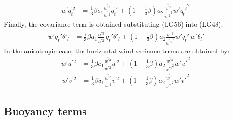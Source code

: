 \documentclass[11pt,fleqn]{article}
\begin{document}
%
\begin{equation}
\label{eq_wpqtp2}
\begin{split}
\overline{w'q_t^{'2}}
& = 
    \frac{1}{3} \beta
    a_1 \frac{\overline{w^{'3}}}{\overline{w^{'2}}} \overline{q_t^{'2}}
  + \left( 1 - \frac{1}{3}\beta \right)
    a_2 \frac{\overline{w^{'3}}}{\overline{w^{'2}}^2} \overline{w'q_t'}^2 \,
\end{split}
\end{equation}
%
Finally, the covariance term is obtained substituting (LG56) into (LG48):
%
\begin{equation}
\label{eq_wpqtpthlp}
\begin{split}
\overline{w'q_t'\theta'_l}
& =
    \frac{1}{3} \beta
    a_1 \frac{\overline{w^{'3}}}{\overline{w^{'2}}} \,
    \overline{q_t'\theta'_l}
  + \left( 1 - \frac{1}{3}\beta \right)
    a_2 \frac{\overline{w^{'3}}}{\overline{w^{'2}}^2}
    \overline{w'q_t'} \, \overline{w'\theta_l'}
\end{split}
\end{equation}
%
In the anisotropic case, the horizontal wind variance terms are obtained by:
%
\begin{equation}
\label{eq_wpup2}
\begin{split}
\overline{w'u^{'2}}
& = 
    \frac{1}{3} \beta
    a_1 \frac{\overline{w^{'3}}}{\overline{w^{'2}}} \overline{u^{'2}}
  + \left( 1 - \frac{1}{3}\beta \right)
    a_2 \frac{\overline{w^{'3}}}{\overline{w^{'2}}^2} \overline{w'u'}^2 \,
\end{split}
\end{equation}
%
\begin{equation}
\label{eq_wpvp2}
\begin{split}
\overline{w'v^{'2}}
& = 
    \frac{1}{3} \beta
    a_1 \frac{\overline{w^{'3}}}{\overline{w^{'2}}} \overline{v^{'2}}
  + \left( 1 - \frac{1}{3}\beta \right)
    a_2 \frac{\overline{w^{'3}}}{\overline{w^{'2}}^2} \overline{w'v'}^2 \,
\end{split}
\end{equation}
%

\subsection{Buoyancy terms}
\end{document}
